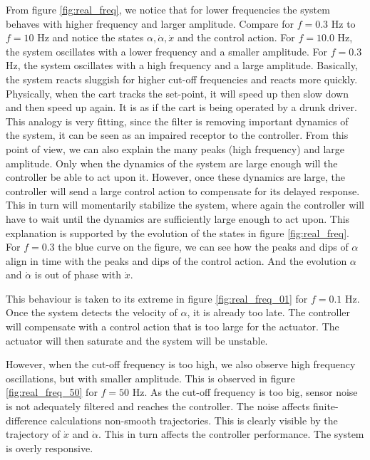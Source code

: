 \documentclass[a4paper,10pt]{article}
\theoremstyle{bluehomework}
\numberwithin{equation}{section}
\begin{document}
From figure \ref{fig:real_freq}, we notice that for lower frequencies the system behaves with higher frequency and larger amplitude. Compare for $f = 0.3$ Hz to $f = 10$ Hz and notice the states $\alpha, \dot{\alpha}, \dot{x}$ and the control action. For $f = 10.0$ Hz, the system oscillates with a lower frequency and a smaller amplitude. For $f = 0.3$ Hz, the system oscillates with a high frequency and a large amplitude. Basically, the system reacts sluggish for higher cut-off frequencies and reacts more quickly. Physically, when the cart tracks the set-point, it will speed up then slow down and then speed up again. It is as if the cart is being operated by a drunk driver. This analogy is very fitting, since the filter is removing important dynamics of the system, it can be seen as an impaired receptor to the controller. From this point of view, we can also explain the many peaks (high frequency) and large amplitude. Only when the dynamics of the system are large enough will the controller be able to act upon it. However, once these dynamics are large, the controller will send a large control action to compensate for its delayed response. This in turn will momentarily stabilize the system, where again the controller will have to wait until the dynamics are sufficiently large enough to act upon. This explanation is supported by the evolution of the states in figure \ref{fig:real_freq}. For $f = 0.3$ the blue curve on the figure, we can see how the peaks and dips of $\alpha$ align in time with the peaks and dips of the control action. And the evolution $\alpha$ and $\dot{\alpha}$ is out of phase with $\dot{x}$.
\medskip

This behaviour is taken to its extreme in figure \ref{fig:real_freq_01} for $f = 0.1$ Hz. Once the system detects the velocity of $\alpha$, it is already too late. The controller will compensate with a control action that is too large for the actuator. The actuator will then saturate and the system will be unstable. 
\medskip

However, when the cut-off frequency is too high, we also observe high frequency oscillations, but with smaller amplitude. This is observed in figure \ref{fig:real_freq_50} for $f = 50$ Hz. As the cut-off frequency is too big, sensor noise is not adequately filtered and reaches the controller. The noise affects finite-difference calculations non-smooth trajectories. This is clearly visible by the trajectory of $\dot{x}$ and $\dot{\alpha}$. This in turn affects the controller performance. The system is overly responsive.
\medskip
\end{document}
